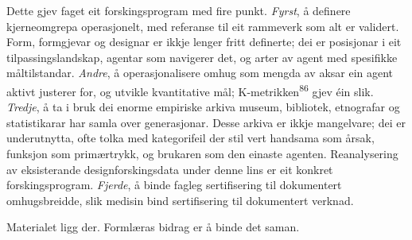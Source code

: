 \begin{widebody}
{Dette gjev faget eit forskingsprogram med fire punkt. \textit{Fyrst}, å definere kjerneomgrepa operasjonelt, med referanse til eit rammeverk som alt er validert. Form, formgjevar og designar er ikkje lenger fritt definerte; dei er posisjonar i eit tilpassingslandskap, agentar som navigerer det, og arter av agent med spesifikke måltilstandar. \textit{Andre}, å operasjonalisere omhug som mengda av aksar ein agent aktivt justerer for, og utvikle kvantitative mål; K-metrikken\textsuperscript{86} gjev éin slik. \textit{Tredje}, å ta i bruk dei enorme empiriske arkiva museum, bibliotek, etnografar og statistikarar har samla over generasjonar. Desse arkiva er ikkje mangelvare; dei er underutnytta, ofte tolka med kategorifeil der stil vert handsama som årsak, funksjon som primærtrykk, og brukaren som den einaste agenten. Reanalysering av eksisterande designforskingsdata under denne lins er eit konkret forskingsprogram. \textit{Fjerde}, å binde fagleg sertifisering til dokumentert omhugsbreidde, slik medisin bind sertifisering til dokumentert verknad.

Materialet ligg der. Formlæras bidrag er å binde det saman.

}
\end{widebody}
